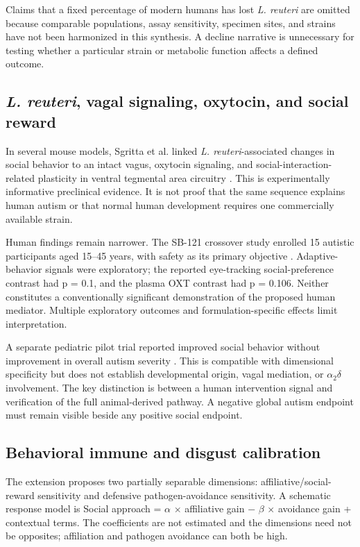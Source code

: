 Claims that a fixed percentage of modern humans has lost \emph{L. reuteri} are omitted because comparable populations, assay sensitivity, specimen sites, and strains have not been harmonized in this synthesis. A decline narrative is unnecessary for testing whether a particular strain or metabolic function affects a defined outcome.


\subsection{\emph{L. reuteri}, vagal signaling, oxytocin, and social reward}

In several mouse models, Sgritta et al. linked \emph{L. reuteri}-associated changes in social behavior to an intact vagus, oxytocin signaling, and social-interaction-related plasticity in ventral tegmental area circuitry \cite{ref4}. This is experimentally informative preclinical evidence. It is not proof that the same sequence explains human autism or that normal human development requires one commercially available strain.

Human findings remain narrower. The SB-121 crossover study enrolled 15 autistic participants aged 15–45 years, with safety as its primary objective \cite{ref5}. Adaptive-behavior signals were exploratory; the reported eye-tracking social-preference contrast had p = 0.1, and the plasma OXT contrast had p = 0.106. Neither constitutes a conventionally significant demonstration of the proposed human mediator. Multiple exploratory outcomes and formulation-specific effects limit interpretation.

A separate pediatric pilot trial reported improved social behavior without improvement in overall autism severity \cite{ref6}. This is compatible with dimensional specificity but does not establish developmental origin, vagal mediation, or \ensuremath{\alpha_2\delta} involvement. The key distinction is between a human intervention signal and verification of the full animal-derived pathway. A negative global autism endpoint must remain visible beside any positive social endpoint.


\subsection{Behavioral immune and disgust calibration}

The extension proposes two partially separable dimensions: affiliative/social-reward sensitivity and defensive pathogen-avoidance sensitivity. A schematic response model is Social approach = \ensuremath{\alpha} \ensuremath{\times} affiliative gain − \ensuremath{\beta} \ensuremath{\times} avoidance gain + contextual terms. The coefficients are not estimated and the dimensions need not be opposites; affiliation and pathogen avoidance can both be high.

